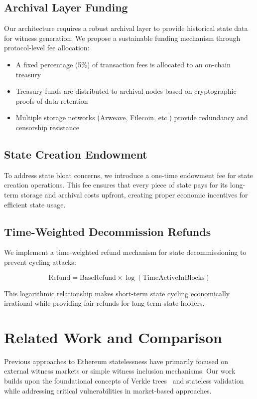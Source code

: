 \documentclass{article}
\begin{document}
\subsection{Archival Layer Funding}

Our architecture requires a robust archival layer to provide historical state data for witness generation. We propose a sustainable funding mechanism through protocol-level fee allocation:

\begin{itemize}
\item A fixed percentage (5\%) of transaction fees is allocated to an on-chain treasury
\item Treasury funds are distributed to archival nodes based on cryptographic proofs of data retention
\item Multiple storage networks (Arweave, Filecoin, etc.) provide redundancy and censorship resistance
\end{itemize}

\subsection{State Creation Endowment}

To address state bloat concerns, we introduce a one-time endowment fee for state creation operations. This fee ensures that every piece of state pays for its long-term storage and archival costs upfront, creating proper economic incentives for efficient state usage.

\subsection{Time-Weighted Decommission Refunds}

We implement a time-weighted refund mechanism for state decommissioning to prevent cycling attacks:

$$\text{Refund} = \text{BaseRefund} \times \log(\text{TimeActiveInBlocks})$$

This logarithmic relationship makes short-term state cycling economically irrational while providing fair refunds for long-term state holders.

\section{Related Work and Comparison}

Previous approaches to Ethereum statelessness have primarily focused on external witness markets or simple witness inclusion mechanisms. Our work builds upon the foundational concepts of Verkle trees~\cite{kuszmaul2018verkle} and stateless validation~\cite{buterin2021statelessness} while addressing critical vulnerabilities in market-based approaches.
\end{document}
